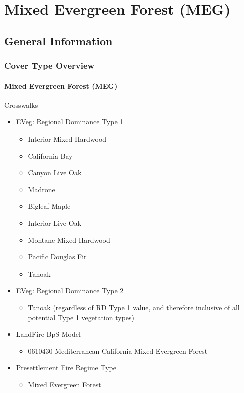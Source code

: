 \newpage
\section{Mixed Evergreen Forest (MEG)}

\subsection*{General Information}

\subsubsection{Cover Type Overview}

\paragraph{Mixed Evergreen Forest (MEG)}

Crosswalks
\begin{itemize}
	\item EVeg: Regional Dominance Type 1
	\begin{itemize}
		\item Interior Mixed Hardwood
		\item California Bay
		\item Canyon Live Oak
		\item Madrone
		\item Bigleaf Maple
		\item Interior Live Oak
		\item Montane Mixed Hardwood 
		\item Pacific Douglas Fir
		\item Tanoak
	\end{itemize}

	\item EVeg: Regional Dominance Type 2
	\begin{itemize}
		\item Tanoak (regardless of RD Type 1 value, and therefore inclusive of all potential Type 1 vegetation types)
	\end{itemize}

	\item LandFire BpS Model
	\begin{itemize}
		\item 0610430 Mediterranean California Mixed Evergreen Forest
	\end{itemize}

	\item Presettlement Fire Regime Type
	\begin{itemize}
		\item Mixed Evergreen Forest
	\end{itemize}
\end{itemize}

